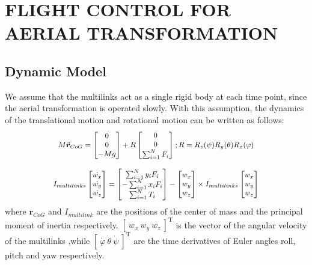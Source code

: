 \section{FLIGHT CONTROL FOR AERIAL TRANSFORMATION}

\subsection{Dynamic Model}
We assume that the multilinks act as a single rigid body at each time point, since the aerial transformation is operated slowly. With this assumption, the dynamics of the translational motion and rotational motion can be written as follows:
\begin{equation}
  \scalebox{0.9}{$
  M\ddot{\bm{r}}_{CoG}=
  \begin{bmatrix}
    0 \\
    0 \\
    -Mg
  \end{bmatrix}
  +R
  \begin{bmatrix}
    0 \\
    0 \\
    \sum^{N}_{i=1}F_{i}
  \end{bmatrix}
  ; \\
  R=R_{z}(\psi)R_{y}(\theta)R_{x}(\varphi) 
  $}
  \label{eq:translation_motioneq}
\end{equation}

\begin{equation}
  \scalebox{0.9}{$
  I_{multilinks}
  \begin{bmatrix}
    \dot{w_x} \\
    \dot{w_y} \\
    \dot{w_z}
  \end{bmatrix}
  =
  \begin{bmatrix}
    \sum^{N}_{i=1} y_{i}F_{i} \\
    -\sum^{N}_{i=1} x_{i}F_{i} \\
    \sum^{N}_{i=1} T_{i}
  \end{bmatrix}
  -
  \begin{bmatrix}
    w_x \\
    w_y \\
    w_z
  \end{bmatrix}
  \times I_{multilinks}
  \begin{bmatrix}
    w_x \\
    w_y \\
    w_z
  \end{bmatrix}
  $}
  \label{eq:rotation_motioneq}
\end{equation}
where $\bm{r}_{CoG}$ and $I_{multilink}$ are the positions of the center of mass and the principal moment of inertia respectively. $[ \ w_x \ w_y \ w_z \ ]^\mathrm{T}$ is the vector of the angular velocity of the multilinks ,while $[ \ \dot{\varphi} \ \dot{\theta} \ \dot{\psi} \ ]^\mathrm{T}$ are the time derivatives of Euler angles roll, pitch and yaw respectively.


